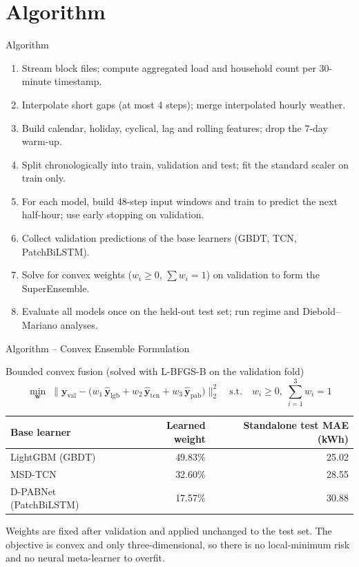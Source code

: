 \documentclass[aspectratio=169]{beamer}
\begin{document}
\section{Algorithm}
\begin{frame}{Algorithm}
  \begin{enumerate}
    \item Stream block files; compute aggregated load and household count per 30-minute timestamp.
    \item Interpolate short gaps (at most 4 steps); merge interpolated hourly weather.
    \item Build calendar, holiday, cyclical, lag and rolling features; drop the 7-day warm-up.
    \item Split chronologically into train, validation and test; fit the standard scaler on train only.
    \item For each model, build 48-step input windows and train to predict the next half-hour; use early stopping on validation.
    \item Collect validation predictions of the base learners (GBDT, TCN, PatchBiLSTM).
    \item Solve for convex weights ($w_i\ge0$, $\sum w_i=1$) on validation to form the SuperEnsemble.
    \item Evaluate all models once on the held-out test set; run regime and Diebold--Mariano analyses.
  \end{enumerate}
\end{frame}

\begin{frame}{Algorithm -- Convex Ensemble Formulation}
  \begin{block}{Bounded convex fusion (solved with L-BFGS-B on the validation fold)}
    \[
      \min_{\mathbf{w}} \;\bigl\lVert \mathbf{y}_{\text{val}} - \bigl(w_1\,\hat{\mathbf{y}}_{\text{lgb}} + w_2\,\hat{\mathbf{y}}_{\text{tcn}} + w_3\,\hat{\mathbf{y}}_{\text{pab}}\bigr)\bigr\rVert_2^2
      \quad \text{s.t.}\quad w_i \ge 0,\; \sum_{i=1}^{3} w_i = 1
    \]
  \end{block}
  \vspace{2pt}
  \centering
  \small
  \begin{tabular}{lrr}
    \toprule
    \textbf{Base learner} & \textbf{Learned weight} & \textbf{Standalone test MAE (kWh)} \\ \midrule
    LightGBM (GBDT)        & 49.83\% & 25.02 \\
    MSD-TCN                & 32.60\% & 28.55 \\
    D-PABNet (PatchBiLSTM) & 17.57\% & 30.88 \\ \bottomrule
  \end{tabular}
  \vspace{4pt}

  {\footnotesize Weights are fixed after validation and applied unchanged to the test set. The objective is convex and only three-dimensional, so there is no local-minimum risk and no neural meta-learner to overfit.}
\end{frame}
\end{document}
